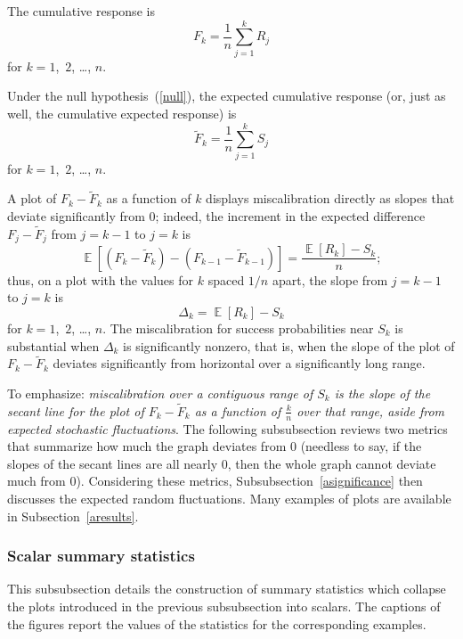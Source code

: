 \documentclass{article}
\DeclareMathOperator{\E}{\mathop{}\mathbb{E}}
\begin{document}
The cumulative response is
%
\begin{equation}
\label{cumresponse}
F_k = \frac{1}{n} \sum_{j=1}^k R_j
\end{equation}
%
for $k = 1$,~$2$, \dots, $n$.

Under the null hypothesis~(\ref{null}), the expected cumulative response
(or, just as well, the cumulative expected response) is
%
\begin{equation}
\label{expresponse}
\tilde{F}_k = \frac{1}{n} \sum_{j=1}^k S_j
\end{equation}
%
for $k = 1$,~$2$, \dots, $n$.

A plot of $F_k-\tilde{F}_k$ as a function of $k$ displays miscalibration
directly as slopes that deviate significantly from 0;
indeed, the increment in the expected difference $F_j-\tilde{F}_j$
from $j = k-1$ to $j = k$ is
%
\begin{equation}
\E[ (F_k-\tilde{F}_k) - (F_{k-1}-\tilde{F}_{k-1}) ]
= \frac{\E[ R_k ] - S_k}{n};
\end{equation}
%
thus, on a plot with the values for $k$ spaced $1/n$ apart,
the slope from $j = k-1$ to $j = k$ is
%
\begin{equation}
\Delta_k = \E[ R_k ] - S_k
\end{equation}
%
for $k = 1$,~$2$, \dots, $n$.
The miscalibration for success probabilities near $S_k$ is substantial
when $\Delta_k$ is significantly nonzero, that is, when the slope
of the plot of $F_k-\tilde{F}_k$ deviates significantly from horizontal
over a significantly long range.

To emphasize: {\it miscalibration over a contiguous range of $S_k$
is the slope of the secant line for the plot of $F_k-\tilde{F}_k$
as a function of $\frac{k}{n}$ over that range,
aside from expected stochastic fluctuations}.
The following subsubsection reviews two metrics that summarize
how much the graph deviates from 0 (needless to say,
if the slopes of the secant lines are all nearly 0,
then the whole graph cannot deviate much from 0).
Considering these metrics, Subsubsection~\ref{asignificance} then discusses
the expected random fluctuations.
Many examples of plots are available in Subsection~\ref{aresults}.


\subsubsection{Scalar summary statistics}
\label{ascalarstats}

This subsubsection details the construction of summary statistics
which collapse the plots introduced in the previous subsubsection
into scalars. The captions of the figures report the values of the statistics
for the corresponding examples.
\end{document}
